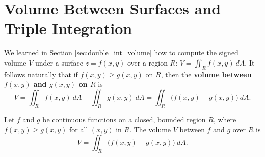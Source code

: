 \section{Volume Between Surfaces and Triple Integration}\label{sec:triple_int}

We learned in Section \ref{sec:double_int_volume} how to compute the signed volume $V$ under a surface $z=f(x,y)$ over a region $R$: $V = \iint_R f(x,y)\ dA$. It follows naturally that if $f(x,y)\geq g(x,y)$ on $R$, then the \textbf{volume between $f(x,y)$ and $g(x,y)$ on $R$} is 
$$V = \iint_R f(x,y)\ dA - \iint_R g(x,y)\ dA = \iint_R \big(f(x,y)-g(x,y)\big)\ dA.$$

{Let $f$ and $g$ be continuous functions on a closed, bounded region $R$, where $f(x,y)\geq g(x,y)$ for all $(x,y)$ in $R$. The volume $V$ between $f$ and $g$ over $R$ is
$$V =\iint_R \big(f(x,y)-g(x,y)\big)\ dA.$$
}
\enlargethispage{2\baselineskip}

